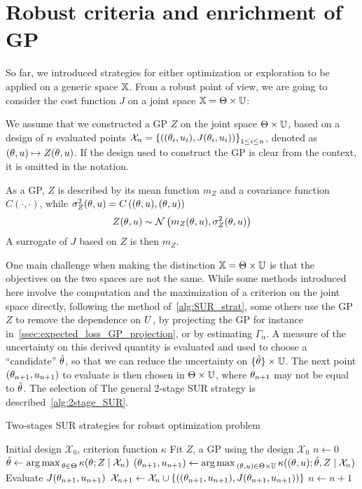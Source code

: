 \documentclass[../../Main_ManuscritThese.tex]{subfiles}
\begin{document}
\section{Robust criteria and enrichment of GP}
So far, we introduced strategies for either optimization or exploration to be applied on a generic space $\mathbb{X}$. From a robust point of view, we are going to consider the cost function $J$ on a joint space $\mathbb{X} = \Theta \times \mathbb{U}$:

We assume that we constructed a GP $Z$ on the joint space $\Theta \times \mathbb{U}$, based on a design of $n$ evaluated points $\mathcal{X}_n = \left\{\left((\theta_i,u_i),J(\theta_i, u_i) \right)\right\}_{1\leq i \leq n}$, denoted as $(\theta,u)\mapsto Z(\theta,u)$. If the design used to construct the GP is clear from the context, it is omitted in the notation.

As a GP, $Z$ is described by its mean function $m_{Z}$ and a covariance function $C(\cdot, \cdot)$, while $\sigma^2_Z(\theta,u) = C\left((\theta,u), (\theta,u)\right)$
\begin{equation}
  Z(\theta,u) \sim \mathcal{N}\left(m_{Z}(\theta,u), \sigma^2_Z(\theta,u) \right)
\end{equation}
A surrogate of $J$ based on $Z$ is then $m_Z$.

One main challenge when making the distinction $\mathbb{X} = \Theta \times \mathbb{U}$ is that the objectives on the two spaces are not the same.
While some methods introduced here involve the computation and the maximization of a criterion on the joint space directly, following the method of~\cref{alg:SUR_strat},
some others use the GP $Z$ to remove the dependence on $U$, by projecting the GP for instance in~\cref{ssec:expected_loss_GP_projection}, or by estimating $\Gamma_{\alpha}$. A measure of the uncertainty on this derived quantity is evaluated and used to choose a ``candidate'' $\tilde{\theta}$, so that we can reduce the uncertainty on $\{\tilde{\theta}\} \times \mathbb{U}$.
The next point $(\theta_{n+1}, u_{n+1})$ to evaluate is then chosen in $\Theta \times \mathbb{U}$, where $\theta_{n+1}$ may not be equal to $\tilde{\theta}$.
The selection of The general 2-stage SUR strategy is described~\cref{alg:2stage_SUR}.


\begin{algorithm}
  \caption{\label{alg:2stage_SUR} Two-stages SUR strategies for robust optimization problem}
\begin{algorithmic}
\REQUIRE Initial design $\mathcal{X}_0$, criterion function $\kappa$
\STATE Fit $Z$, a GP using the design $\mathcal{X}_0$
\STATE $n \leftarrow 0$
\STATE $\tilde{\theta} \leftarrow \operatorname*{arg\,max \,}_{\theta \in \Theta} \kappa(\theta; Z \mid \mathcal{X}_{n})$
\STATE $(\theta_{n+1},u_{n+1}) \leftarrow \operatorname*{arg\,max \,}_{(\theta,u) \in \Theta\times\mathbb{U}} \kappa((\theta,u); \tilde{\theta}, Z \mid \mathcal{X}_{n})$
\STATE Evaluate $J(\theta_{n+1}, u_{n+1})$
\STATE $\mathcal{X}_{n+1} \leftarrow \mathcal{X}_n \cup \left\{\left((\theta_{n+1},u_{n+1}), J(\theta_{n+1}, u_{n+1})\right)\right\}$
\STATE $n \leftarrow n + 1$
\ENDWHILE
\end{algorithmic}
\end{algorithm}
\end{document}
